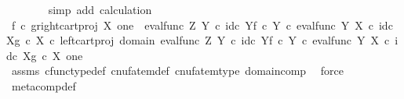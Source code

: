 \begin{isabellebody}
\ \ \ \ \ \ \isamarkupfalse%
\ {\isacharparenleft}{\kern0pt}simp\ add{\isacharcolon}{\kern0pt}\ calculation{\isacharparenright}{\kern0pt}\isanewline
\ \ \isamarkupfalse%
\isanewline
\ \ \isamarkupfalse%
\ \isamarkupfalse%
\ {\isachardoublequoteopen}{\isacharparenleft}{\kern0pt}f\isactrlsup {\isasymflat}\ {\isasymcirc}\isactrlsub c\ {\isasymlangle}g\isactrlsup {\isasymflat}{\isacharcomma}{\kern0pt}right{\isacharunderscore}{\kern0pt}cart{\isacharunderscore}{\kern0pt}proj\ X\ one{\isasymrangle}{\isacharparenright}{\kern0pt}\isactrlsup {\isasymsharp}\ {\isacharequal}{\kern0pt}\ {\isacharparenleft}{\kern0pt}{\isacharparenleft}{\kern0pt}{\isacharparenleft}{\kern0pt}eval{\isacharunderscore}{\kern0pt}func\ Z\ Y\ {\isasymcirc}\isactrlsub c\ {\isasymlangle}id\isactrlsub c\ Y{\isacharcomma}{\kern0pt}f\ {\isasymcirc}\isactrlsub c\ {\isasymbeta}\isactrlbsub Y\isactrlesub {\isasymrangle}{\isacharparenright}{\kern0pt}\ {\isasymcirc}\isactrlsub c\ eval{\isacharunderscore}{\kern0pt}func\ Y\ X\ {\isasymcirc}\isactrlsub c\ {\isasymlangle}id\isactrlsub c\ X{\isacharcomma}{\kern0pt}g\ {\isasymcirc}\isactrlsub c\ {\isasymbeta}\isactrlbsub X\isactrlesub {\isasymrangle}{\isacharparenright}{\kern0pt}\ {\isasymcirc}\isactrlsub c\ left{\isacharunderscore}{\kern0pt}cart{\isacharunderscore}{\kern0pt}proj\ {\isacharparenleft}{\kern0pt}domain\ {\isacharparenleft}{\kern0pt}{\isacharparenleft}{\kern0pt}eval{\isacharunderscore}{\kern0pt}func\ Z\ Y\ {\isasymcirc}\isactrlsub c\ {\isasymlangle}id\isactrlsub c\ Y{\isacharcomma}{\kern0pt}f\ {\isasymcirc}\isactrlsub c\ {\isasymbeta}\isactrlbsub Y\isactrlesub {\isasymrangle}{\isacharparenright}{\kern0pt}\ {\isasymcirc}\isactrlsub c\ eval{\isacharunderscore}{\kern0pt}func\ Y\ X\ {\isasymcirc}\isactrlsub c\ {\isasymlangle}id\isactrlsub c\ X{\isacharcomma}{\kern0pt}g\ {\isasymcirc}\isactrlsub c\ {\isasymbeta}\isactrlbsub X\isactrlesub {\isasymrangle}{\isacharparenright}{\kern0pt}{\isacharparenright}{\kern0pt}\ one{\isacharparenright}{\kern0pt}\isactrlsup {\isasymsharp}{\isachardoublequoteclose}\isanewline
\ \ \ \ \isamarkupfalse%
\ assms\ cfunc{\isacharunderscore}{\kern0pt}type{\isacharunderscore}{\kern0pt}def\ cnufatem{\isacharunderscore}{\kern0pt}def{}\ cnufatem{\isacharunderscore}{\kern0pt}type\ domain{\isacharunderscore}{\kern0pt}comp\ \isamarkupfalse%
\ force\isanewline
{}\isamarkupfalse%
%
\endisatagproof
{\isafoldproof}%
%
\isadelimproof
\isanewline
%
\endisadelimproof
\isanewline
{}\isamarkupfalse%
\ meta{\isacharunderscore}{\kern0pt}comp{}{\isacharunderscore}{\kern0pt}def{}{\isacharcolon}{\kern0pt}\isanewline

\end{isabellebody}
